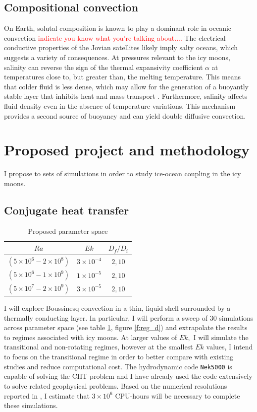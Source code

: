 \documentclass{article}
\def\lb{\left(}
\def\rb{\right)}
\begin{document}
\subsection{Compositional convection}
On Earth, solutal composition is known to play a dominant role in oceanic convection \textcolor{red}{indicate you know what you're talking about....} The electrical conductive properties of the Jovian satellites likely imply salty oceans\citep{cZ00}, which suggests a variety of consequences. At pressures relevant to the icy moons, salinity can reverse the sign of the thermal expansivity coefficient $\alpha$ at temperatures close to, but greater than, the melting temperature. This means that colder fluid is less dense, which may allow for the generation of a buoyantly stable layer that inhibits heat and mass transport \citep{aT64}. 
Furthermore, salinity affects fluid density even in the absence of temperature variations. This mechanism provides a second source of buoyancy and can yield double diffusive convection.
\section{Proposed project and methodology}
I propose to sets of simulations in order to study ice-ocean coupling in the icy moons.
\subsection{Conjugate heat transfer}
\begin{table}
\begin{center}
\begin{tabular}{|c|c|c|}
\hline
$Ra$&$Ek$&$D_{f}/D_{i}$\\
\hline
$\lb 5 \times 10^{6} - 2 \times 10^{8} \rb $ & $3 \times 10^{-4} $ & $2,10$\\
\hline
$\lb 5 \times 10^{6} - 1 \times 10^{9} \rb $ & $1 \times 10^{-5} $ & $2,10$\\
\hline
$\lb 5 \times 10^{7} - 2 \times 10^{9} \rb $ & $3 \times 10^{-5} $ & $2,10$\\
\hline
\end{tabular}
\end{center}
\caption{Proposed parameter space}
\label{t:param}
\end{table}
I will explore Boussinesq convection in a thin, liquid shell surrounded by a thermally conducting layer. 
In particular, I will perform a sweep of $30$ simulations across parameter space (see table \ref{t:param}, figure \ref{f:reg_d}) and extrapolate the results to regimes associated with icy moons.
At larger values of $Ek,$ I will simulate the transitional and non-rotating regimes, however at the smallest $Ek$ values, I intend to focus on the transitional regime in order to better compare with existing studies and reduce computational cost.
The hydrodynamic code \texttt{Nek5000}\citep{nek5000} is capable of solving the CHT problem and I have already used the code extensively to solve related geophysical problems. 
Based on the numerical resolutions reported in \citep{dL23}, I estimate that $3\times 10^{6}$ CPU-hours will be necessary to complete these simulations.
\end{document}
